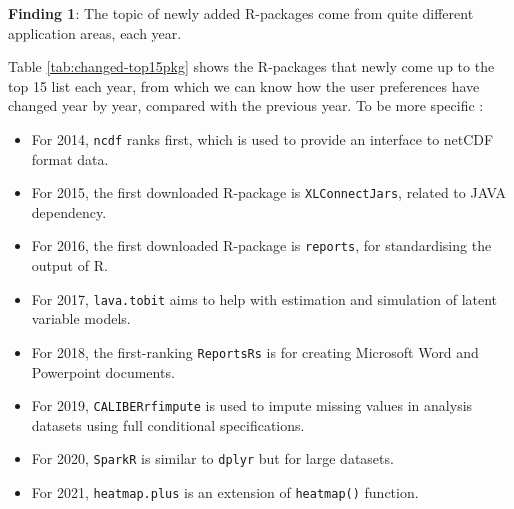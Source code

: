 \documentclass[
]{book}
\providecommand{\tightlist}{%
  \setlength{\itemsep}{0pt}\setlength{\parskip}{0pt}}
\newenvironment{discovery}[1]{%
  \begin{tcolorbox}[colback=blue!30,colframe=blue!80!black]#1}{\end{tcolorbox}}
\begin{document}
\begin{discovery}
\textbf{Finding 1}: The topic of newly added R-packages come from quite
different application areas, each year.
\end{discovery}

Table \ref{tab:changed-top15pkg} shows the R-packages that newly come up to the top 15 list each year, from which we can know how the user preferences have changed year by year, compared with the previous year. To be more specific :

\begin{itemize}
\tightlist
\item
  For 2014, \texttt{ncdf} ranks first, which is used to provide an interface to netCDF format data.
\item
  For 2015, the first downloaded R-package is \texttt{XLConnectJars}, related to JAVA dependency.
\item
  For 2016, the first downloaded R-package is \texttt{reports}, for standardising the output of R.
\item
  For 2017, \texttt{lava.tobit} aims to help with estimation and simulation of latent variable models.
\item
  For 2018, the first-ranking \texttt{ReportsRs} is for creating Microsoft Word and Powerpoint documents.
\item
  For 2019, \texttt{CALIBERrfimpute} is used to impute missing values in analysis datasets using full conditional specifications.
\item
  For 2020, \texttt{SparkR} is similar to \texttt{dplyr} but for large datasets.
\item
  For 2021, \texttt{heatmap.plus} is an extension of \texttt{heatmap()} function.
\end{itemize}
\end{document}
